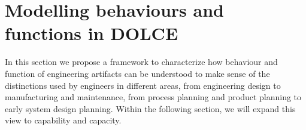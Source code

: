 \documentclass[sw]{iosart2x}
\newcommand{\DOLCE}{\textsc{DOLCE}\xspace} %
\begin{document}
\section{Modelling behaviours and functions in \DOLCE \label{sec:capabilitiesEtc}}
In this section we propose a framework to characterize how behaviour and function of engineering artifacts can be understood to make sense of the distinctions used by engineers in different areas, from engineering design to manufacturing and maintenance, from process planning and product planning to early system design planning. Within the following section, we will expand this view to capability and capacity.
\end{document}
